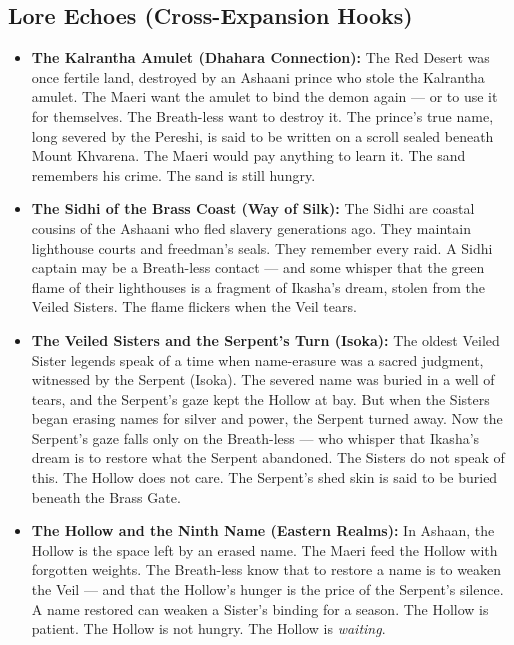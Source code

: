 \subsection*{Lore Echoes (Cross-Expansion Hooks)}
\begin{itemize}
  \item \textbf{The Kalrantha Amulet (Dhahara Connection):} The Red Desert was once fertile land, destroyed by an Ashaani prince who stole the Kalrantha amulet. The Maeri want the amulet to bind the demon again --- or to use it for themselves. The Breath-less want to destroy it. The prince's true name, long severed by the Pereshi, is said to be written on a scroll sealed beneath Mount Khvarena. The Maeri would pay anything to learn it. The sand remembers his crime. The sand is still hungry.
  
  \item \textbf{The Sidhi of the Brass Coast (Way of Silk):} The Sidhi are coastal cousins of the Ashaani who fled slavery generations ago. They maintain lighthouse courts and freedman's seals. They remember every raid. A Sidhi captain may be a Breath-less contact --- and some whisper that the green flame of their lighthouses is a fragment of Ikasha's dream, stolen from the Veiled Sisters. The flame flickers when the Veil tears.
  
  \item \textbf{The Veiled Sisters and the Serpent's Turn (Isoka):} The oldest Veiled Sister legends speak of a time when name-erasure was a sacred judgment, witnessed by the Serpent (Isoka). The severed name was buried in a well of tears, and the Serpent's gaze kept the Hollow at bay. But when the Sisters began erasing names for silver and power, the Serpent turned away. Now the Serpent's gaze falls only on the Breath-less --- who whisper that Ikasha's dream is to restore what the Serpent abandoned. The Sisters do not speak of this. The Hollow does not care. The Serpent's shed skin is said to be buried beneath the Brass Gate.
  
  \item \textbf{The Hollow and the Ninth Name (Eastern Realms):} In Ashaan, the Hollow is the space left by an erased name. The Maeri feed the Hollow with forgotten weights. The Breath-less know that to restore a name is to weaken the Veil --- and that the Hollow's hunger is the price of the Serpent's silence. A name restored can weaken a Sister's binding for a season. The Hollow is patient. The Hollow is not hungry. The Hollow is \emph{waiting}.
  

\end{itemize}
